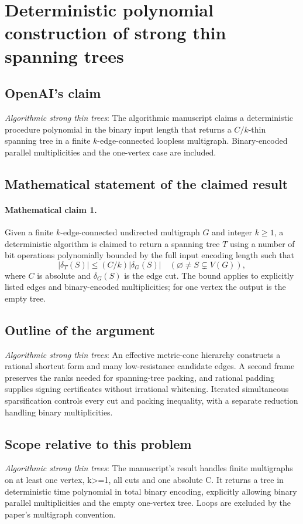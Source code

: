\documentclass[11pt]{article}
\begin{document}
\section*{Deterministic polynomial construction of strong thin spanning trees}

\subsection{OpenAI's claim}
\textit{Algorithmic strong thin trees}: The algorithmic manuscript claims a deterministic procedure polynomial in the binary input length that returns a $C/k$-thin spanning tree in a finite $k$-edge-connected loopless multigraph. Binary-encoded parallel multiplicities and the one-vertex case are included.

\subsection{Mathematical statement of the claimed result}
\paragraph{Mathematical claim 1.} Given a finite $k$-edge-connected undirected multigraph $G$ and integer $k\ge1$, a deterministic algorithm is claimed to return a spanning tree $T$ using a number of bit operations polynomially bounded by the full input encoding length such that \[|\delta_T(S)|\le(C/k)|\delta_G(S)|\quad(\varnothing\ne S\subsetneq V(G)),\] where $C$ is absolute and $\delta_G(S)$ is the edge cut. The bound applies to explicitly listed edges and binary-encoded multiplicities; for one vertex the output is the empty tree.

\subsection{Outline of the argument}
\textit{Algorithmic strong thin trees}: An effective metric-cone hierarchy constructs a rational shortcut form and many low-resistance candidate edges. A second frame preserves the ranks needed for spanning-tree packing, and rational padding supplies signing certificates without irrational whitening. Iterated simultaneous sparsification controls every cut and packing inequality, with a separate reduction handling binary multiplicities.

\subsection{Scope relative to this problem}
\textit{Algorithmic strong thin trees}: The manuscript’s result handles finite multigraphs on at least one vertex, k>=1, all cuts and one absolute C. It returns a tree in deterministic time polynomial in total binary encoding, explicitly allowing binary parallel multiplicities and the empty one-vertex tree. Loops are excluded by the paper's multigraph convention.
\end{document}
